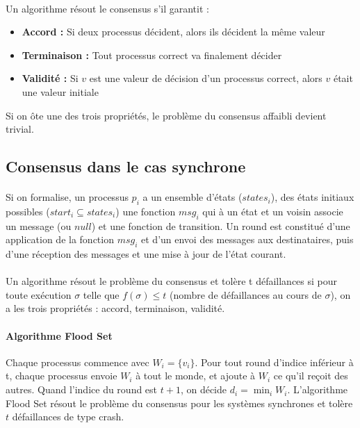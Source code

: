 \documentclass[french]{article}
\begin{document}
\paragraph{}Un algorithme résout le consensus s'il garantit :
\begin{itemize}
	\item \textbf{Accord :} Si deux processus décident, alors ils décident la même valeur
	\item \textbf{Terminaison :} Tout processus correct va finalement décider
	\item \textbf{Validité :} Si $v$ est une valeur de décision d'un processus correct, alors $v$ était une valeur initiale
\end{itemize}

Si on ôte une des trois propriétés, le problème du consensus affaibli devient trivial.

\subsection{Consensus dans le cas synchrone}

\paragraph{}Si on formalise, un processus $p_i$ a un ensemble d'états ($states_i$), des états initiaux possibles ($start_i \subseteq states_i$) une fonction $msg_i$ qui à un état et un voisin associe un message (ou $null$) et une fonction de transition.
Un round est constitué d'une application de la fonction $msg_i$ et d'un envoi des messages aux destinataires, puis d'une réception des messages et une mise à jour de l'état courant.

\paragraph{}Un algorithme résout le problème du consensus et tolère t défaillances si pour toute exécution $\sigma$ telle que $f(\sigma) \leq t$ (nombre de défaillances au cours de $\sigma$), on a les trois propriétés : accord, terminaison, validité.

\paragraph{Algorithme Flood Set} Chaque processus commence avec $W_i = \lbrace v_i \rbrace$. Pour tout round d'indice inférieur à t, chaque processus envoie $W_i$ à tout le monde, et ajoute à $W_i$ ce qu'il reçoit des autres. Quand l'indice du round est $t + 1$, on décide $d_i = \min_i W_i$. L'algorithme Flood Set résout le problème du consensus pour les systèmes synchrones et tolère $t$ défaillances de type crash.
\end{document}
